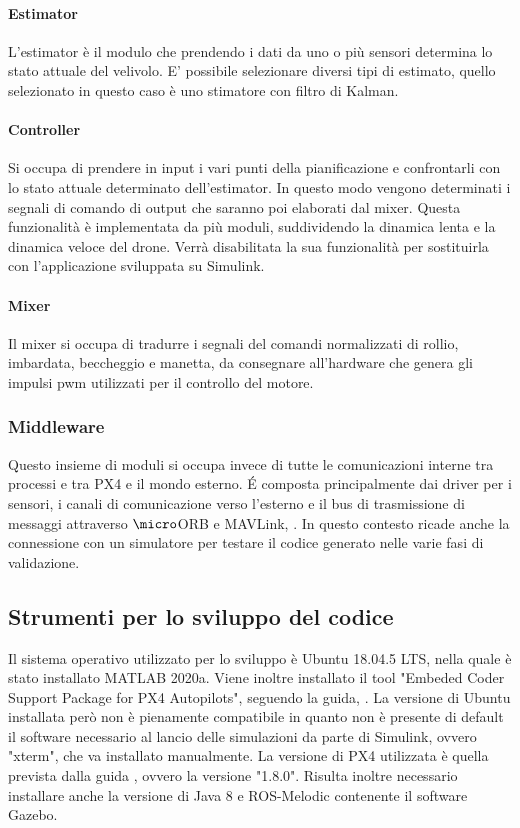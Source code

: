 \paragraph{Estimator}
L'estimator è il modulo che prendendo i dati da uno o più sensori determina lo stato attuale del velivolo. E' possibile selezionare diversi tipi di estimato, quello selezionato in questo caso è uno stimatore con filtro di Kalman.
\paragraph{Controller}
Si occupa di prendere in input i vari punti della pianificazione e confrontarli con lo stato attuale determinato dell'estimator. In questo modo vengono determinati i segnali di comando di output che saranno poi elaborati dal mixer. Questa funzionalità è implementata da più moduli, suddividendo la dinamica lenta e la dinamica veloce del drone. Verrà disabilitata la sua funzionalità per sostituirla con l'applicazione sviluppata su Simulink.
\paragraph{Mixer}
Il mixer si occupa di tradurre i segnali del comandi normalizzati di rollio, imbardata, beccheggio e manetta, da consegnare all'hardware che genera gli impulsi pwm utilizzati per il controllo del motore.
\subsubsection{Middleware}
Questo insieme di moduli si occupa invece di tutte le comunicazioni interne tra processi e tra PX4 e il mondo esterno. \'E composta principalmente dai driver per i sensori, i canali di comunicazione verso l'esterno e il bus di trasmissione di messaggi attraverso $\micro$ORB e MAVLink, \cite{MAVLink}. In questo contesto ricade anche  la connessione con un simulatore per testare il codice generato nelle varie fasi di validazione.
\subsection{Strumenti per lo sviluppo del codice}
Il sistema operativo utilizzato per lo sviluppo è Ubuntu 18.04.5 LTS, nella quale è stato installato MATLAB 2020a. Viene inoltre installato il tool "Embeded Coder Support Package for PX4 Autopilots", seguendo la guida, \cite{PX4MATLAB}. La versione di Ubuntu  installata però non è pienamente compatibile in quanto non è presente di default il software necessario al lancio delle simulazioni da parte di Simulink, ovvero "xterm", che va installato manualmente. La versione di PX4 utilizzata è quella prevista dalla guida \cite{PX4MATLAB}, ovvero la versione "1.8.0". Risulta inoltre necessario installare anche la versione di Java 8 e ROS-Melodic contenente il software Gazebo.

